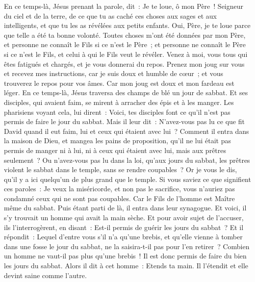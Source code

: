 \begin{multicols}{2}
En ce temps-là, Jésus prenant la parole, dit~: Je te loue, ô mon Père~! Seigneur du ciel et de la terre, de ce que tu as caché ces choses aux sages et aux intelligents, et que tu les as révélées aux petits enfants.
Oui, Père, je te loue parce que telle a été ta bonne volonté.
Toutes choses m'ont été données par mon Père, et personne ne connaît le Fils si ce n'est le Père~; et personne ne connaît le Père si ce n'est le Fils, et celui à qui le Fils veut le révéler.
Venez à moi, vous tous qui êtes fatigués et chargés, et je vous donnerai du repos.
Prenez mon joug sur vous et recevez mes instructions, car je suis doux et humble de cœur~; et vous trouverez le repos pour vos âmes.
Car mon joug est doux et mon fardeau est léger.
\VerseOne{}En ce temps-là, Jésus traversa des champs de blé un jour de sabbat. Et ses disciples, qui avaient faim, se mirent à arracher des épis et à les manger.
Les pharisiens voyant cela, lui dirent~: Voici, tes disciples font ce qu'il n'est pas permis de faire le jour du sabbat.
Mais il leur dit~: N'avez-vous pas lu ce que fit David quand il eut faim, lui et ceux qui étaient avec lui~?
Comment il entra dans la maison de Dieu, et mangea les pains de proposition, qu'il ne lui était pas permis de manger ni à lui, ni à ceux qui étaient avec lui, mais aux prêtres seulement~?
Ou n'avez-vous pas lu dans la loi, qu'aux jours du sabbat, les prêtres violent le sabbat dans le temple, sans se rendre coupables~?
Or je vous le dis, qu'il y a ici quelqu'un de plus grand que le temple.
Si vous saviez ce que signifient ces paroles~: Je veux la miséricorde, et non pas le sacrifice, vous n'auriez pas condamné ceux qui ne sont pas coupables.
Car le Fils de l'homme est Maître même du sabbat.
Puis étant parti de là, il entra dans leur synagogue.
Et voici, il s'y trouvait un homme qui avait la main sèche. Et pour avoir sujet de l'accuser, ils l'interrogèrent, en disant~: Est-il permis de guérir les jours du sabbat~?
Et il répondit~: Lequel d'entre vous s'il n'a qu'une brebis, et qu'elle vienne à tomber dans une fosse le jour du sabbat, ne la saisira-t-il pas pour l'en retirer~?
Combien un homme ne vaut-il pas plus qu'une brebis~! Il est donc permis de faire du bien les jours du sabbat.
Alors il dit à cet homme~: Etends ta main. Il l'étendit et elle devint saine comme l'autre.

\end{multicols}
